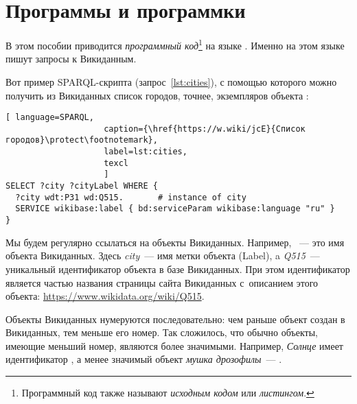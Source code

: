 

\chapter{Программы и программки}
\label{ch:listing_about}

В этом пособии приводится \emph{программный код}\footnote[][0cm]{%
    Программный код также называют  \emph{исходным кодом} или 
    \emph{листингом}.
%   
} на языке . 
Именно на этом языке пишут запросы к Викиданным.


Вот пример SPARQL-скрипта (запрос~\ref{lst:cities}), 
с помощью которого можно получить из Викиданных список городов, 
точнее, экземпляров объекта
:

\begin{lstlisting}[ language=SPARQL, 
                    caption={\href{https://w.wiki/jcE}{Список городов}\protect\footnotemark},
                    label=lst:cities,
                    texcl 
                    ]
SELECT ?city ?cityLabel WHERE { 
  ?city wdt:P31 wd:Q515.       # instance of city
  SERVICE wikibase:label { bd:serviceParam wikibase:language "ru" }
}
\end{lstlisting}%

Мы будем регулярно ссылаться на объекты Викиданных. 
Например, ~--- это имя объекта Викиданных. 
Здесь \emph{city}~--- имя метки объекта (Label), 
a \emph{Q515}~--- уникальный идентификатор объекта в базе Викиданных. 
При этом идентификатор является частью названия страницы сайта Викиданных 
с~описанием этого объекта: \href{https://www.wikidata.org/wiki/Q515}{https://www.wikidata.org/wiki/Q515}.

\label{WDObjectsNumbering}
Объекты Викиданных нумеруются последовательно: чем раньше 
объект создан в Викиданных, тем меньше его номер. 
Так сложилось, что обычно объекты, имеющие меньший номер, являются более значимыми. 
Например, \emph{Солнце} имеет идентификатор , а менее значимый объект \emph{мушка дрозофилы}~--- .

